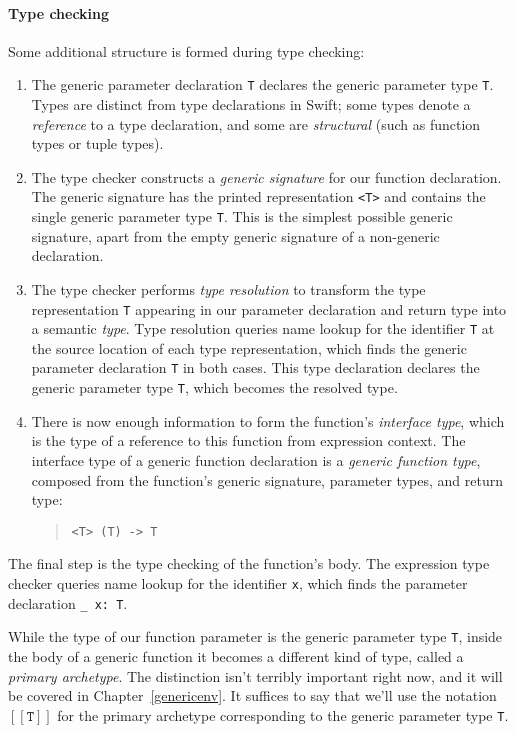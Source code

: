 \documentclass[a4paper,headsepline,bibliography=totoc,toc=flat,fleqn,twoside=semi]{scrbook}
\theoremstyle{definition}
\theoremstyle{definition}
\theoremstyle{definition}
\newcommand{\archetype}[1]{$[\![\texttt{#1}]\!]$}
\begin{document}
\paragraph{Type checking} Some additional structure is formed during type checking:
\begin{enumerate}
\item The generic parameter declaration \texttt{T} declares the generic parameter type \texttt{T}. Types are distinct from type declarations in Swift; some types denote a \emph{reference} to a type declaration, and some are \emph{structural} (such as function types or tuple types).
\item The type checker constructs a \emph{generic signature} for our function declaration. The generic signature has the printed representation \texttt{<T>} and contains the single generic parameter type \texttt{T}. This is the simplest possible generic signature, apart from the empty generic signature of a non-generic declaration.

\item The type checker performs \emph{type resolution} to transform the type representation \texttt{T} appearing in our parameter declaration and return type into a semantic \emph{type}. Type resolution queries name lookup for the identifier \texttt{T} at the source location of each type representation, which finds the generic parameter declaration \texttt{T} in both cases. This type declaration declares the generic parameter type \texttt{T}, which becomes the resolved type.

\item There is now enough information to form the function's \emph{interface type}, which is the type of a reference to this function from expression context. The interface type of a generic function declaration is a \emph{generic function type}, composed from the function's generic signature, parameter types, and return type:
\begin{quote}
\begin{verbatim}
<T> (T) -> T
\end{verbatim}
\end{quote}
\end{enumerate}
The final step is the type checking of the function's body. The expression type checker queries name lookup for the identifier \texttt{x}, which finds the parameter declaration \verb|_ x: T|.

While the type of our function parameter is the generic parameter type \texttt{T}, inside the body of a generic function it becomes a different kind of type, called a \emph{primary archetype}. The distinction isn't terribly important right now, and it will be covered in Chapter~\ref{genericenv}. It suffices to say that we'll use the notation \archetype{T} for the primary archetype corresponding to the generic parameter type \texttt{T}.
\end{document}
